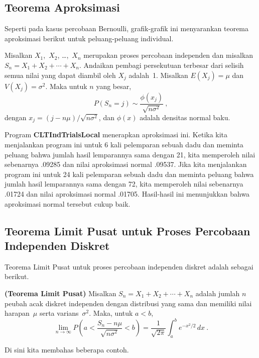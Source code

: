 
\subsection*{Teorema Aproksimasi}
Seperti pada kasus percobaan Bernoulli, grafik-grafik ini menyarankan teorema aproksimasi
berikut untuk peluang-peluang individual.

\begin{theorem}\label{thm 9.3.5}
Misalkan $X_1$,~$X_2$, \dots,~$X_n$ merupakan proses percobaan independen dan misalkan $S_n =
X_1 + X_2 +\cdots+ X_n$.  Andaikan pembagi persekutuan terbesar dari selisih semua nilai yang
dapat diambil oleh $X_j$ adalah~1.  Misalkan $E(X_j) = \mu$ dan $V(X_j) = \sigma^2$.  Maka untuk
$n$ yang besar,
$$
P(S_n = j) \sim \frac {\phi(x_j)}{\sqrt{n\sigma^2}}\ ,
$$
dengan $x_j = (j - n\mu)/\sqrt{n\sigma^2}$, dan $\phi(x)$ adalah densitas normal baku.
\end{theorem}

Program {\bf CLTIndTrialsLocal} menerapkan aproksimasi ini.
Ketika kita menjalankan program ini untuk 6 kali pelemparan sebuah dadu dan meminta peluang bahwa
jumlah hasil lemparannya sama dengan 21, kita memperoleh nilai sebenarnya .09285 dan nilai
aproksimasi normal .09537.  Jika kita menjalankan program ini untuk 24 kali pelemparan sebuah dadu
dan meminta peluang bahwa jumlah hasil lemparannya sama dengan 72, kita memperoleh nilai sebenarnya
.01724 dan nilai aproksimasi normal .01705.  Hasil-hasil ini menunjukkan bahwa aproksimasi normal
tersebut cukup baik.

\subsection*{Teorema Limit Pusat untuk Proses Percobaan Independen Diskret}
Teorema Limit Pusat untuk proses percobaan independen diskret adalah sebagai berikut.

\begin{theorem}{\bf (Teorema Limit Pusat)}\label{thm 9.3.6} 
Misalkan $S_n = X_1 + X_2 +\cdots+ X_n$ adalah jumlah $n$ peubah acak diskret independen
dengan distribusi yang sama dan memiliki nilai harapan~$\mu$ serta varians~$\sigma^2$.  Maka, untuk
$a < b$,
$$
\lim_{n \to \infty} P\left( a < \frac {S_n - n\mu}{\sqrt{n\sigma^2}} < b\right)
= \frac 1{\sqrt{2\pi}} \int_a^b e^{-x^2/2}\, dx\ .
$$
\end{theorem}
\par
{}  Di sini kita membahas beberapa contoh.

